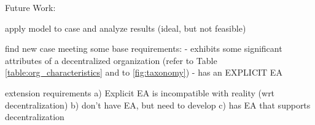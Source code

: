 Future Work:

apply model to case and analyze results (ideal, but not feasible)

find new case meeting some base requirements:
 - exhibits some significant attributes of a decentralized organization (refer to Table \ref{table:org_characteristics} and to \ref{fig:taxonomy})
 - has an EXPLICIT EA

extension requirements
 a) Explicit EA is incompatible with reality (wrt decentralization)
 b) don't have EA, but need to develop
 c) has EA that supports decentralization